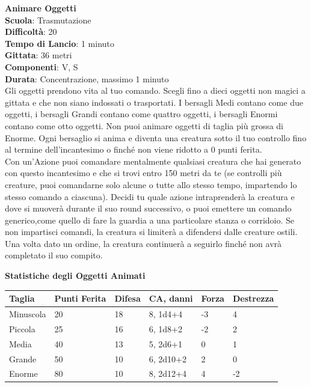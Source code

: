 \begin{multicols}{2}
\medskip\textbf{Animare Oggetti}\\
\textbf{Scuola}: Trasmutazione\\
\textbf{Difficoltà}: 20\\
\textbf{Tempo di Lancio}: 1 minuto\\
\textbf{Gittata}: 36 metri\\
\textbf{Componenti}: V, S\\
\textbf{Durata}: Concentrazione, massimo 1 minuto\\
Gli oggetti prendono vita al tuo comando. Scegli fino a dieci oggetti non magici a gittata e che non siano indossati o trasportati. I bersagli Medi contano come due oggetti, i bersagli Grandi contano come quattro oggetti, i bersagli Enormi contano come otto oggetti. Non puoi animare oggetti di taglia più grossa di Enorme. Ogni bersaglio si anima e diventa una creatura sotto il tuo controllo fino al termine dell'incantesimo o finché non viene ridotto a 0 punti ferita.\\
Con un'Azione puoi comandare mentalmente qualsiasi creatura che hai generato con questo incantesimo e che si trovi entro 150 metri da te (se controlli più creature, puoi comandarne solo alcune o tutte allo stesso tempo, impartendo lo stesso comando a ciascuna). Decidi tu quale azione intraprenderà la creatura e dove si muoverà durante il suo round successivo, o puoi emettere un comando generico,come quello di fare la guardia a una particolare stanza o corridoio. Se non impartisci comandi, la creatura si limiterà a difendersi dalle creature ostili. Una volta dato un ordine, la creatura continuerà a seguirlo finché non avrà completato il suo compito.
\bigskip

\end{multicols}

\textbf{Statistiche degli Oggetti Animati}
\bigskip

\begin{tabular}{llllll}
Taglia		&Punti Ferita	&Difesa	&CA, danni					&Forza	&Destrezza\\ 
\toprule
Minuscola 	&20 			&18		&8, {1d4+4} 	&-3 		&4\\
Piccola 	&25 			&16 	&6, {1d8+2} 	&-2 		&2\\
Media 		&40 			&13 	&5, {2d6+1} 	&0 			&1\\
Grande 		&50 			&10 	&6, {2d10+2}	&2 			&0\\
Enorme 		&80 			&10 	&8, {2d12+4}	&4 			&-2\\
\end{tabular}

